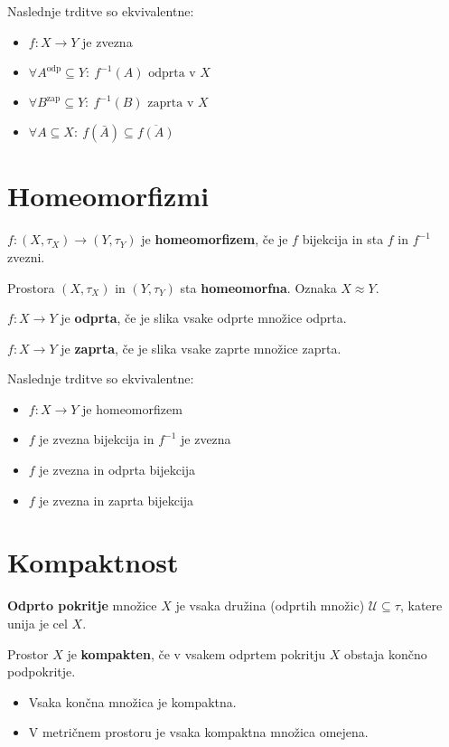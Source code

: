 Naslednje trditve so ekvivalentne:
\begin{itemize}
	\item $f: X \to Y$ je zvezna
	\item $\forall A^{\text{odp}} \subseteq Y:\ f^{-1}(A) \text{ odprta v }X$
	\item $\forall B^{\text{zap}} \subseteq Y:\ f^{-1}(B) \text{ zaprta v }X$
	\item $\forall A \subseteq X:\ f(\bar{A}) \subseteq \overline{f(A)}$
\end{itemize}

\section*{Homeomorfizmi}
$f: (X, \tau_X) \to (Y, \tau_Y)$ je \textbf{homeomorfizem}, če je $f$ bijekcija in sta $f$ in $f^{-1}$ zvezni.

Prostora $(X, \tau_X)$ in $(Y, \tau_Y)$ sta \textbf{homeomorfna}. Oznaka $X \approx Y$.

$f: X \to Y$ je \textbf{odprta}, če je slika vsake odprte množice odprta. 

$f: X \to Y$ je \textbf{zaprta}, če je slika vsake zaprte množice zaprta. 

Naslednje trditve so ekvivalentne:
\begin{itemize}
	\item $f: X \to Y$ je homeomorfizem
	\item $f$ je zvezna bijekcija in $f^{-1}$ je zvezna
	\item $f$ je zvezna in odprta bijekcija
	\item $f$ je zvezna in zaprta bijekcija
\end{itemize}

\section*{Kompaktnost}
\textbf{Odprto pokritje} množice $X$ je vsaka družina (odprtih množic) $\mathcal{U} \subseteq \tau$, katere unija je cel $X$.

Prostor $X$ je \textbf{kompakten}, če v vsakem odprtem pokritju $X$ obstaja končno podpokritje.

\begin{itemize}
	\item Vsaka končna množica je kompaktna.
	\item V metričnem prostoru je vsaka kompaktna množica omejena.
\end{itemize}

